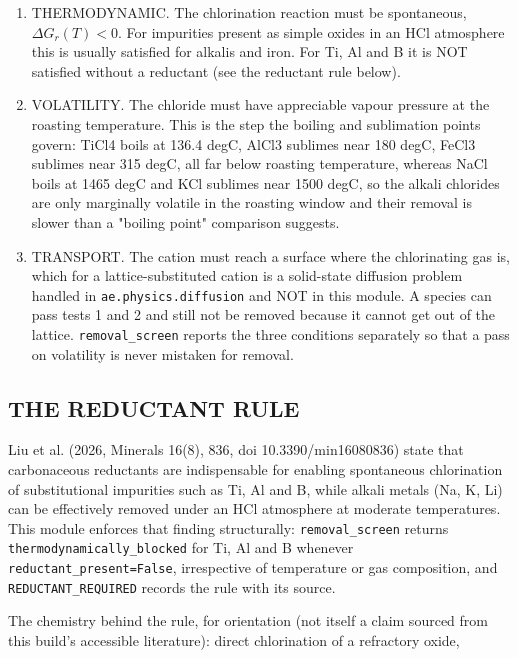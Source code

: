 \documentclass[10pt,a4paper,twoside]{report}
\begin{document}
\begin{enumerate}[leftmargin=*,label=\arabic*.]
\item THERMODYNAMIC. The chlorination reaction must be spontaneous, $\Delta G_r(T) < 0$. For impurities present as simple oxides in an HCl atmosphere this is usually satisfied for alkalis and iron. For Ti, Al and B it is NOT satisfied without a reductant (see the reductant rule below).
\item VOLATILITY. The chloride must have appreciable vapour pressure at the roasting temperature. This is the step the boiling and sublimation points govern: TiCl4 boils at 136.4 degC, AlCl3 sublimes near 180 degC, FeCl3 sublimes near 315 degC, all far below roasting temperature, whereas NaCl boils at 1465 degC and KCl sublimes near 1500 degC, so the alkali chlorides are only marginally volatile in the roasting window and their removal is slower than a "boiling point" comparison suggests.
\item TRANSPORT. The cation must reach a surface where the chlorinating gas is, which for a lattice-substituted cation is a solid-state diffusion problem handled in \texttt{ae.physics.diffusion} and NOT in this module. A species can pass tests 1 and 2 and still not be removed because it cannot get out of the lattice. \texttt{removal\_screen} reports the three conditions separately so that a pass on volatility is never mistaken for removal.
\end{enumerate}

\subsection*{THE REDUCTANT RULE}

Liu et al. (2026, Minerals 16(8), 836, doi 10.3390/min16080836) state that carbonaceous reductants are indispensable for enabling spontaneous chlorination of substitutional impurities such as Ti, Al and B, while alkali metals (Na, K, Li) can be effectively removed under an HCl atmosphere at moderate temperatures. This module enforces that finding structurally: \texttt{removal\_screen} returns \texttt{thermodynamically\_blocked} for Ti, Al and B whenever \texttt{reductant\_present=False}, irrespective of temperature or gas composition, and \texttt{REDUCTANT\_REQUIRED} records the rule with its source.

The chemistry behind the rule, for orientation (not itself a claim sourced from this build's accessible literature): direct chlorination of a refractory oxide,
\end{document}
